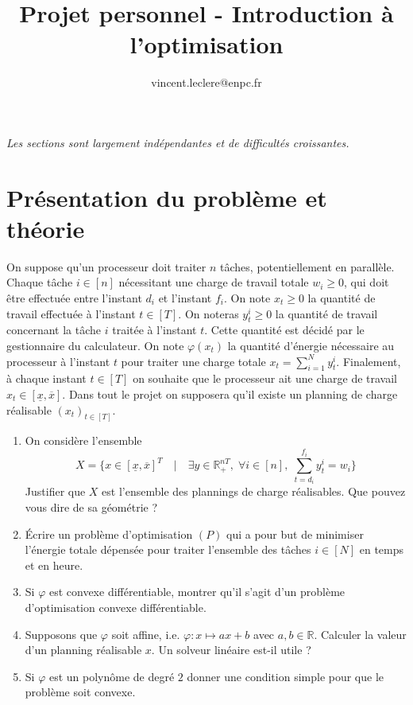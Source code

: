 \documentclass[10pt]{article}
\title{Projet personnel - Introduction à l'optimisation}
\author{vincent.leclere@enpc.fr}
\def\R{\mathbb{R}}
\begin{document}
\maketitle

{\em Les sections sont largement indépendantes et de difficultés croissantes. }

\section{Présentation du problème et théorie}

On suppose qu'un processeur doit traiter $n$ tâches, potentiellement en parallèle. Chaque tâche $i\in[n]$
nécessitant une charge de travail totale $w_i \geq 0$, qui doit être effectuée entre l'instant
$d_i$ et l'instant $f_i$. On note $x_t \geq 0$ la quantité de travail effectuée à l'instant
$t \in [T]$.
On noteras $y_t^i \geq 0$ la quantité de travail concernant
la tâche $i$ traitée à l'instant $t$. Cette quantité est décidé par le gestionnaire du calculateur.
On note $\varphi(x_t)$ la quantité d'énergie nécessaire au processeur à l'instant
$t$ pour traiter une charge totale $x_t = \sum_{i=1}^N y_t^i$.
Finalement, à chaque instant $t\in[T]$ on souhaite
que le processeur ait une charge de travail $x_t \in [\underline{x},\overline{x}]$.
Dans tout le projet on supposera qu'il existe un planning de charge réalisable $(x_t)_{t\in[T]}$.

\begin{enumerate}
 \item On considère l'ensemble
 $$X = \{x \in [\underline{x},\overline{x}]^T \quad | \quad \exists y \in \R_+^{nT}, \; \forall i\in[n],\; \sum_{t=d_i}^{f_i}y_t^i = w_i\}$$
 Justifier que $X$ est l'ensemble des plannings de charge réalisables. Que pouvez vous dire de sa géométrie ?
 \item \'Ecrire un problème d'optimisation $(P)$ qui a pour but de minimiser l'énergie totale dépensée pour traiter l'ensemble des tâches $i\in[N]$ en temps et en heure.
 \item Si $\varphi$ est convexe différentiable, montrer qu'il s'agit d'un problème d'optimisation convexe différentiable.
 \item Supposons que $\varphi$ soit affine, i.e. $\varphi : x  \mapsto ax + b $ avec $a,b\in\R$.
 Calculer la valeur d'un planning réalisable $x$. Un solveur linéaire est-il utile ?
 \item Si $\varphi$ est un polynôme de degré $2$ donner une condition simple pour que le problème soit convexe.
\end{enumerate}
\end{document}
